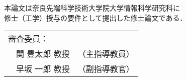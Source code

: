 \newpage
\thispagestyle{empty}
\vspace*{8cm}
\begin{center}
本論文は奈良先端科学技術大学院大学情報科学研究科に$\ $ \\
修士（工学）授与の要件として提出した修士論文である．

 \bigskip

 \jauthor
 \vspace*{0.4cm}
 \begin{table}[h]
 \begin{center}
	\begin{tabular}[t]{p{}ll}
	 \multicolumn{2}{l}{審査委員：} \\
	 & 関 豊太郎 教授 & （主指導教員） \\
	 & 早坂 一郎 教授 & （副指導教官）
	\end{tabular}
 \end{center}
 \end{table}
 \end{center}
